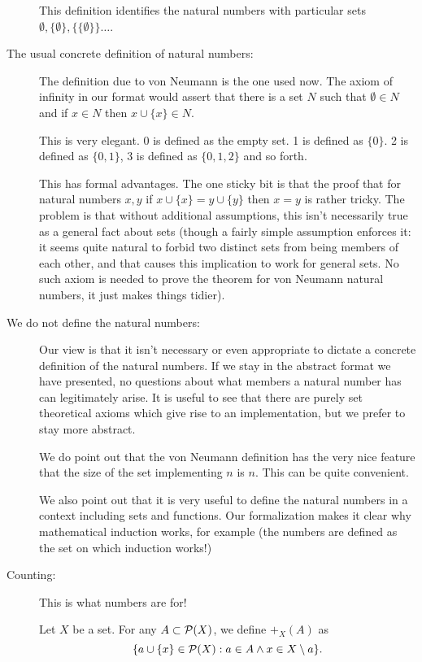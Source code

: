 \documentclass[12pt]{article}
\begin{document}
\begin{description}
This definition identifies the natural numbers with particular sets $\emptyset, \{\emptyset\}, \{\{\emptyset\}\}\ldots$.

\item[The usual concrete definition of natural numbers:]

The definition due to von Neumann is the one used now.  The axiom of infinity in our format would assert
that there is a set $N$ such that $\emptyset \in N$ and if $x \in N$ then $x \cup \{x\} \in N$.

This is very elegant.  0 is defined as the empty set.  1 is defined as $\{0\}$.  2 is defined as $\{0,1\}$,  3 is defined as $\{0,1,2\}$ and so forth.

This has formal advantages.  The one sticky bit is that the proof that for natural numbers $x,y$ if $x \cup \{x\} = y \cup \{y\}$ then $x=y$ is rather tricky.  The problem is that without additional assumptions, this isn't necessarily true as a general fact about sets (though a fairly simple assumption enforces it:  it seems quite natural to forbid two distinct sets from being members of each other, and that causes this implication to work for general sets.  No such axiom is needed to prove the theorem for von Neumann natural numbers, it just makes things tidier).

\item[We do not define the natural numbers:]  Our view is that it isn't necessary or even appropriate to dictate a concrete definition of the natural numbers.  If we stay in the abstract format we have presented, no questions about what members a natural number has can legitimately arise.  It is useful to see that there are purely set theoretical axioms which give rise to an implementation, but we prefer to stay more abstract.

We do point out that the von Neumann definition has the very nice feature that the size of the set implementing $n$ is $n$.  This can be quite convenient.

We also point out that it is very useful to define the natural numbers in a context including sets and functions.  Our formalization makes it clear why mathematical induction works, for example (the numbers are defined as the set on which induction works!)

\item[Counting:]  This is what numbers are for!

Let $X$ be a set.  For any $A \subset {\cal P}(X)$, we define $+_X(A)$ as $$\{a \cup \{x\} \in {\cal P}(X):  a \in A \wedge x \in X\setminus a\}.$$


\end{description}
\end{document}

